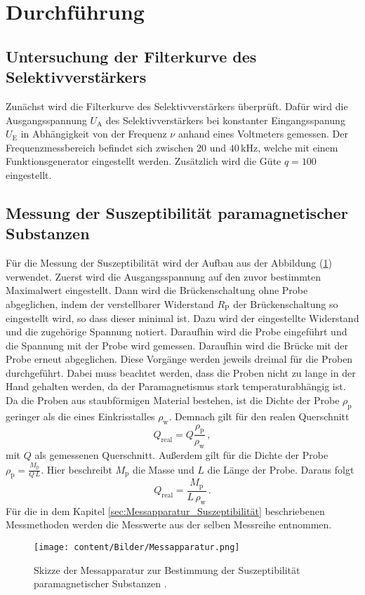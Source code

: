 \section{Durchführung}
\label{sec:Durchführung}
\subsection{Untersuchung der Filterkurve des Selektivverstärkers}
Zunächst wird die Filterkurve des Selektivverstärkers überprüft. Dafür wird die Ausgangsspannung $U_{\text{A}}$ des Selektivverstärkers bei 
konstanter Eingangsspanung $U_{\text{E}}$  in Abhängigkeit von der Frequenz $\nu$ anhand eines Voltmeters gemessen. Der Frequenzmessbereich befindet sich zwischen
$20$ und $40\,\unit{\kilo\hertz}$, welche mit einem Funktionsgenerator eingestellt werden. Zusätzlich wird die Güte $q=100$ eingestellt.

\subsection{Messung der Suszeptibilität paramagnetischer Substanzen}
Für die Messung der Suszeptibilität wird der Aufbau aus der Abbildung (\ref{fig:Messapparatur}) verwendet. Zuerst wird die Ausgangsspannung
auf den zuvor bestimmten Maximalwert eingestellt. Dann wird die Brückenschaltung ohne Probe abgeglichen, indem der verstellbarer Widerstand $R_{\text{P}}$
der Brückenschaltung so eingestellt wird, so dass dieser minimal ist. Dazu wird der eingestellte Widerstand und die zugehörige Spannung notiert. Daraufhin 
wird die Probe eingeführt und die Spannung mit der Probe wird gemessen. Daraufhin wird die Brücke mit der Probe erneut abgeglichen. Diese Vorgänge werden jeweils
dreimal für die Proben durchgeführt. Dabei muss beachtet werden, dass die Proben nicht zu lange in der Hand gehalten werden, da der Paramagnetismus stark temperaturabhängig ist.
Da die Proben aus staubförmigen Material bestehen, ist die Dichte der Probe $\rho _{\text{p}}$ geringer als die eines Einkrisstalles $\rho _{\text{w}}$. Demnach gilt für den realen Querschnitt 
\begin{equation}
    Q_{\text{real}}= Q \frac{\rho_{\text{p}}}{\rho_{\text{w}}}\,,
    \label{eqn:Querschnitt}
\end{equation}
mit $Q$ als gemessenen Querschnitt. Außerdem gilt für die Dichte der Probe $\rho_{\text{p}} = \frac{M_{\text{p}}}{Q\, L}$. Hier beschreibt $M_{\text{p}}$  die Masse und
$L$ die Länge der Probe. Daraus folgt
\begin{equation}
    Q_{\text{real}}= \frac{M_{\text{p}}}{L\,\rho_{\text{w}}}\,.
    \label{eqn:Querschnitt_Real}
\end{equation}
Für die in dem Kapitel \ref{sec:Messapparatur_Suszeptibilität}
beschriebenen Messmethoden werden die Messwerte aus der selben Messreihe entnommen. 
\begin{figure}[H]
    \centering
    \texttt{[image: content/Bilder/Messapparatur.png]}
    \caption{Skizze der Messapparatur zur Bestimmung der Suszeptibilität paramagnetischer Substanzen \cite{anleitungV606}.}
    \label{fig:Messapparatur}
\end{figure} 